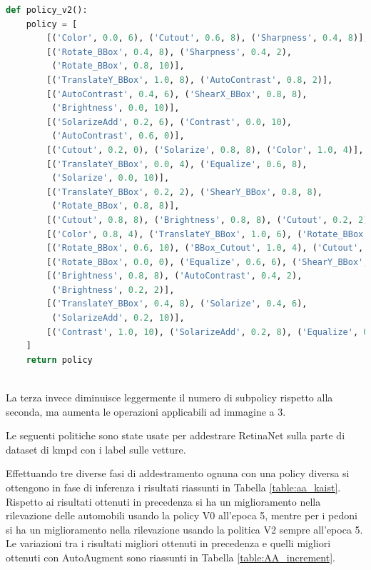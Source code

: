 \begin{lstlisting}[caption={Policy V2 di AutoAugment}, language=Python, basicstyle=\tiny,label=code:policy_v2]
def policy_v2():
    policy = [
        [('Color', 0.0, 6), ('Cutout', 0.6, 8), ('Sharpness', 0.4, 8)],
        [('Rotate_BBox', 0.4, 8), ('Sharpness', 0.4, 2),
         ('Rotate_BBox', 0.8, 10)],
        [('TranslateY_BBox', 1.0, 8), ('AutoContrast', 0.8, 2)],
        [('AutoContrast', 0.4, 6), ('ShearX_BBox', 0.8, 8),
         ('Brightness', 0.0, 10)],
        [('SolarizeAdd', 0.2, 6), ('Contrast', 0.0, 10),
         ('AutoContrast', 0.6, 0)],
        [('Cutout', 0.2, 0), ('Solarize', 0.8, 8), ('Color', 1.0, 4)],
        [('TranslateY_BBox', 0.0, 4), ('Equalize', 0.6, 8),
         ('Solarize', 0.0, 10)],
        [('TranslateY_BBox', 0.2, 2), ('ShearY_BBox', 0.8, 8),
         ('Rotate_BBox', 0.8, 8)],
        [('Cutout', 0.8, 8), ('Brightness', 0.8, 8), ('Cutout', 0.2, 2)],
        [('Color', 0.8, 4), ('TranslateY_BBox', 1.0, 6), ('Rotate_BBox', 0.6, 6)],
        [('Rotate_BBox', 0.6, 10), ('BBox_Cutout', 1.0, 4), ('Cutout', 0.2, 8)],
        [('Rotate_BBox', 0.0, 0), ('Equalize', 0.6, 6), ('ShearY_BBox', 0.6, 8)],
        [('Brightness', 0.8, 8), ('AutoContrast', 0.4, 2),
         ('Brightness', 0.2, 2)],
        [('TranslateY_BBox', 0.4, 8), ('Solarize', 0.4, 6),
         ('SolarizeAdd', 0.2, 10)],
        [('Contrast', 1.0, 10), ('SolarizeAdd', 0.2, 8), ('Equalize', 0.2, 4)],
    ]
    return policy
  
\end{lstlisting}
La terza invece diminuisce leggermente il numero di subpolicy rispetto alla seconda, ma aumenta le operazioni applicabili ad immagine a 3. 

Le seguenti politiche sono state usate per addestrare RetinaNet sulla parte di dataset di \ac{kmpd} con i label sulle vetture. 

Effettuando tre diverse fasi di addestramento ognuna con una policy diversa si ottengono in fase di inferenza i risultati riassunti in Tabella \ref{table:aa_kaist}. Rispetto ai risultati ottenuti in precedenza si ha un miglioramento nella rilevazione delle automobili usando la policy V0 all'epoca 5, mentre per i pedoni si ha un miglioramento nella rilevazione usando la politica V2 sempre all'epoca 5. Le variazioni tra i risultati migliori ottenuti in precedenza e quelli migliori ottenuti con AutoAugment sono riassunti in Tabella \ref{table:AA_increment}.

